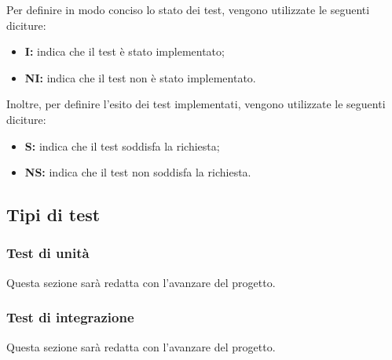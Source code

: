 Per definire in modo conciso lo stato dei test, vengono utilizzate le seguenti diciture:
\begin{itemize}
    \item \textbf{I:} indica che il test è stato implementato;
    \item \textbf{NI:} indica che il test non è stato implementato.
\end{itemize}
Inoltre, per definire l'esito dei test implementati, vengono utilizzate le seguenti diciture:
\begin{itemize}
    \item \textbf{S:} indica che il test soddisfa la richiesta;
    \item \textbf{NS:} indica che il test non soddisfa la richiesta.
\end{itemize}
\subsection{Tipi di test}
\subsubsection{Test di unità}
Questa sezione sarà redatta con l'avanzare del progetto.
\subsubsection{Test di integrazione}
Questa sezione sarà redatta con l'avanzare del progetto.
